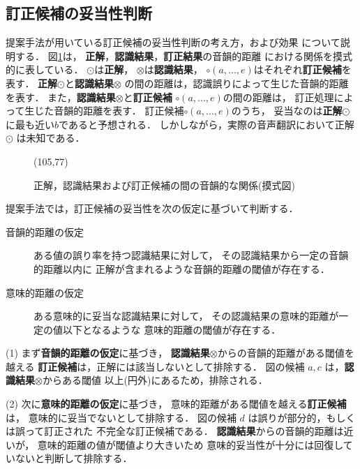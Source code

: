 \subsection{訂正候補の妥当性判断}

提案手法が用いている訂正候補の妥当性判断の考え方，および効果
について説明する．
図\ref{phonetic-relations}は，
{\bf 正解}，{\bf 認識結果}，{\bf 訂正結果}の音韻的距離
における関係を摸式的に表している．
$\odot$は{\bf 正解}，
$\otimes$は{\bf 認識結果}，
$\circ(a, ..., e)$はそれぞれ{\bf 訂正候補}を表す．
{\bf 正解}$\odot$と{\bf 認識結果}$\otimes$
の間の距離は，認識誤りによって生じた音韻的距離を表す．
また，{\bf 認識結果}$\otimes$と{\bf 訂正候補}
$\circ(a, ..., e)$の間の距離は，
訂正処理によって生じた音韻的距離を表す．
訂正候補$\circ(a, ..., e)$のうち，
妥当なのは{\bf 正解}$\odot$ に最も近い$b$であると予想される．
しかしながら，実際の音声翻訳において正解 $\odot$ は未知である．

\begin{figure}[hbt]
\begin{center}
\atari(105,77)
\caption{正解，認識結果および訂正候補の間の音韻的な関係(摸式図)}
\label{phonetic-relations}
\end{center}
\end{figure}

提案手法では，訂正候補の妥当性を次の仮定に基づいて判断する．

\begin{description}
\item[音韻的距離の仮定] 
ある値の誤り率を持つ認識結果に対して，
その認識結果から一定の音韻的距離以内に
正解が含まれるような音韻的距離の閾値が存在する．

\item[意味的距離の仮定] 
ある意味的に妥当な認識結果に対して，
その認識結果の意味的距離が一定の値以下となるような
意味的距離の閾値が存在する．
\end{description}

(1) まず{\bf 音韻的距離の仮定}に基づき，
{\bf 認識結果}$\otimes$からの音韻的距離がある閾値を越える
{\bf 訂正候補}は，正解には該当しないとして排除する．
図の候補 $a, c$ は，{\bf 認識結果}$\otimes$からある閾値
以上(円外)にあるため，排除される．

(2) 次に{\bf 意味的距離の仮定}に基づき，
意味的距離がある閾値を越える{\bf 訂正候補}は，
意味的に妥当でないとして排除する．
図の候補 $d$ は誤りが部分的，もしくは誤って訂正された
不完全な訂正候補である．
{\bf 認識結果}からの音韻的距離は近いが，
意味的距離の値が閾値より大きいため
意味的妥当性が十分には回復していないと判断して排除する．

